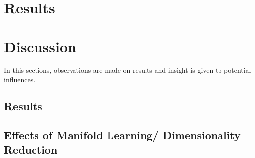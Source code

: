 \documentclass[conference]{IEEEtran}
\begin{document}
\section{Results} \label{Results}








\section{Discussion} \label{Discussion}
In this sections, observations are made on results and insight is given to potential influences.

\subsection{Results}

\subsection{Effects of Manifold Learning/ Dimensionality Reduction}
\end{document}
